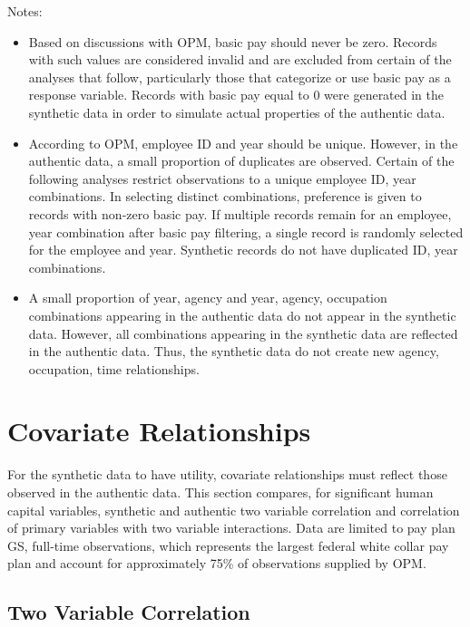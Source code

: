 \documentclass[10pt, letterpaper]{article}
\begin{document}
\begin{spacing}{1.0}
\vspace{12pt}

Notes:
\begin{itemize}
    \item Based on discussions with OPM, basic pay should never be zero.  Records with such values are considered invalid and are excluded from certain of the analyses that follow, particularly those that categorize or use basic pay as a response variable.  Records with basic pay equal to 0 were generated in the synthetic data in order to simulate actual properties of the authentic data.
    \item According to OPM, employee ID and year should be unique.  However, in the authentic data, a small proportion of duplicates are observed.  Certain of the following analyses restrict observations to a unique employee ID, year combinations.  In selecting distinct combinations, preference is given to records with non-zero basic pay.  If multiple records remain for an employee, year combination after basic pay filtering, a single record is randomly selected for the employee and year.  Synthetic records do not have duplicated ID, year combinations.
    \item A small proportion of year, agency and year, agency, occupation combinations appearing in the authentic data do not appear in the synthetic data.  However, all combinations appearing in the synthetic data are reflected in the authentic data.  Thus, the synthetic data do not create new agency, occupation, time relationships.
\end{itemize}

\clearpage

\section{Covariate Relationships}

For the synthetic data to have utility, covariate relationships must reflect those observed in the authentic data.  This section compares, for significant human capital variables, synthetic and authentic two variable correlation and correlation of primary variables with two variable interactions.  Data are limited to pay plan GS, full-time observations, which represents the largest federal white collar pay plan and account for approximately 75\% of observations supplied by OPM.

\subsection{Two Variable Correlation}


\end{spacing}
\end{document}
